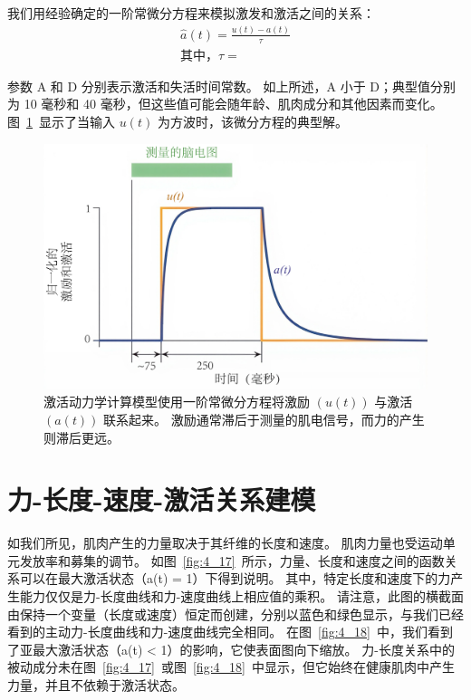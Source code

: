 我们用经验确定的一阶常微分方程来模拟激发和激活之间的关系：
%
\begin{equation} \label{eq:4_1}
	\begin{aligned}
		\hat{a}(t) = \frac{u(t) - a(t)}{\tau} \\
		\text{其中，} \tau =
	\end{aligned}
\end{equation}


参数 A 和 D 分别表示激活和失活时间常数。
如上所述，A 小于 D；典型值分别为 10 毫秒和 40 毫秒，但这些值可能会随年龄、肌肉成分和其他因素而变化。
图~\ref{fig:4_16}~显示了当输入 $u(t)$ 为方波时，该微分方程的典型解。

\begin{figure}[!htb]
	\centering
	\includegraphics[width=0.6\linewidth]{chap4/4_16}
	\caption{激活动力学计算模型使用一阶常微分方程将激励 $(u(t))$ 与激活 $(a(t))$ 联系起来。
		激励通常滞后于测量的肌电信号，而力的产生则滞后更远。 \label{fig:4_16}}
\end{figure}


\section{力-长度-速度-激活关系建模}

如我们所见，肌肉产生的力量取决于其纤维的长度和速度。
肌肉力量也受运动单元发放率和募集的调节。
如图~\ref{fig:4_17}~所示，力量、长度和速度之间的函数关系可以在最大激活状态（a(t) = 1）下得到说明。
其中，特定长度和速度下的力产生能力仅仅是力-长度曲线和力-速度曲线上相应值的乘积。
请注意，此图的横截面由保持一个变量（长度或速度）恒定而创建，分别以蓝色和绿色显示，与我们已经看到的主动力-长度曲线和力-速度曲线完全相同。
在图~\ref{fig:4_18}~中，我们看到了亚最大激活状态（a(t) < 1）的影响，它使表面图向下缩放。
力-长度关系中的被动成分未在图~\ref{fig:4_17}~或图~\ref{fig:4_18}~中显示，但它始终在健康肌肉中产生力量，并且不依赖于激活状态。

